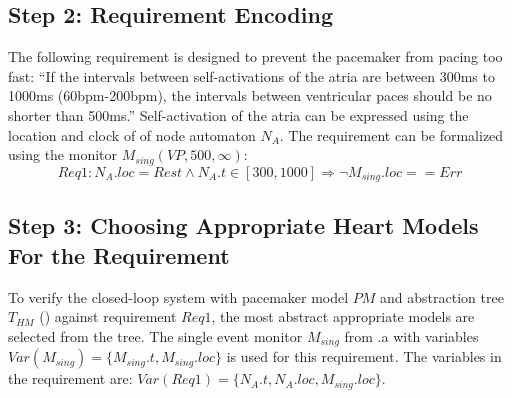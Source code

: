 \subsection*{Step 2: Requirement Encoding}
The following requirement is designed to prevent the pacemaker from pacing too fast: 
``If the intervals between self-activations of the atria are between 300ms to 1000ms (60bpm-200bpm), the intervals between ventricular paces should be no shorter than 500ms.''
Self-activation of the atria can be expressed using the location and clock of of node automaton $N_A$.
The requirement can be formalized using the monitor  $M_{sing}(VP,500,\infty)$:
\[Req1: N_A.loc=Rest \land N_A.t\in [300,1000] \Rightarrow \neg M_{sing}.loc==Err\]
%
 \subsection*{Step 3: Choosing Appropriate Heart Models For the Requirement}
To verify the closed-loop system with pacemaker model $PM$ and abstraction tree $T_{HM}$ () against requirement $Req1$, the most abstract appropriate models are selected from the tree. 
The single event monitor $M_{sing}$ from .a with variables $Var(M_{sing})=\{M_{sing}.t,M_{sing}.loc\}$ is used for this requirement. 
The variables in the requirement are:
$Var(Req1)=\{N_A.t,N_A.loc,M_{sing}.loc\}$.

